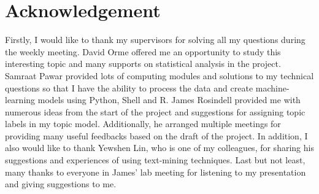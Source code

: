 \section*{Acknowledgement}

Firstly, I would like to thank my supervisors for solving all my questions during the weekly meeting. David Orme offered me an opportunity to study this interesting topic and many supports on statistical analysis in the project. Samraat Pawar provided lots of computing modules and solutions to my technical questions so that I have the ability to process the data and create machine-learning models using Python, Shell and R. James Rosindell provided me with numerous ideas from the start of the project and suggestions for assigning topic labels in my topic model. Additionally, he arranged multiple meetings for providing many useful feedbacks based on the draft of the project. In addition, I also would like to thank Yewshen Lin, who is one of my colleagues, for sharing his suggestions and experiences of using text-mining techniques. Last but not least, many thanks to everyone in James' lab meeting for listening to my presentation and giving suggestions to me.
